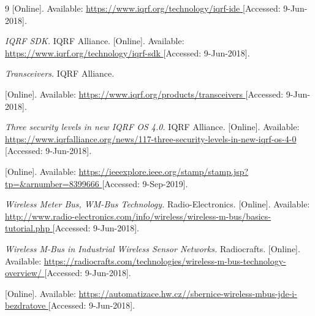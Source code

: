 \begin{thebibliography}{9}
[Online]. Available:
\url{
https://www.iqrf.org/technology/iqrf-ide
}
[Accessed: 9-Jun-2018].




\textit{
IQRF SDK.
}
IQRF Alliance.
[Online]. Available:
\url{
https://www.iqrf.org/technology/iqrf-sdk
}
[Accessed: 9-Jun-2018].



\textit{
Transceivers.
}
IQRF Alliance.

[Online]. Available:
\url{
https://www.iqrf.org/products/transceivers
}
[Accessed: 9-Jun-2018].


\textit{
Three security levels in new IQRF OS 4.0.
}
IQRF Alliance.
[Online]. Available:
\url{
https://www.iqrfalliance.org/news/117-three-security-levels-in-new-iqrf-os-4-0
}
[Accessed: 9-Jun-2018].



[Online]. Available:
\url{
https://ieeexplore.ieee.org/stamp/stamp.jsp?tp=&arnumber=8399666
}
[Accessed: 9-Sep-2019].




\textit{
Wireless Meter Bus, WM-Bus Technology.
}
Radio-Electronics.
[Online]. Available:
\url{
http://www.radio-electronics.com/info/wireless/wireless-m-bus/basics-tutorial.php
}
[Accessed: 9-Jun-2018].


\textit{
Wireless M-Bus in Industrial Wireless Sensor Networks.
}
Radiocrafts.
[Online]. Available:
\url{
https://radiocrafts.com/technologies/wireless-m-bus-technology-overview/
}
[Accessed: 9-Jun-2018].


[Online]. Available:
\url{
https://automatizace.hw.cz//sbernice-wireless-mbus-jde-i-bezdratove
}
[Accessed: 9-Jun-2018].




\end{thebibliography}
